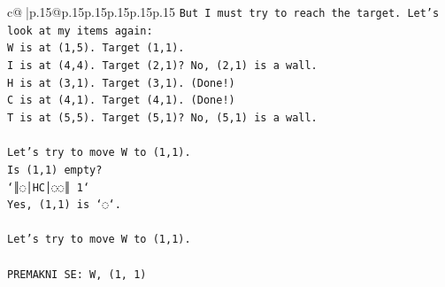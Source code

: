 \documentclass{article}
\begin{document}
{\begin{supertabular}{c@{$\;$}|p{.15\linewidth}@{}p{.15\linewidth}p{.15\linewidth}p{.15\linewidth}p{.15\linewidth}p{.15\linewidth}}
{{{\texttt{But I must try to reach the target. Let's look at my items again:} \\
\texttt{W is at (1,5). Target (1,1).} \\
\texttt{I is at (4,4). Target (2,1)? No, (2,1) is a wall.} \\
\texttt{H is at (3,1). Target (3,1). (Done!)} \\
\texttt{C is at (4,1). Target (4,1). (Done!)} \\
\texttt{T is at (5,5). Target (5,1)? No, (5,1) is a wall.} \\
\\ 
\texttt{Let's try to move W to (1,1).} \\
\texttt{Is (1,1) empty?} \\
\texttt{`║◌│HC│◌◌║ 1`} \\
\texttt{Yes, (1,1) is `◌`.} \\
\\ 
\texttt{Let's try to move W to (1,1).} \\
\\ 
\texttt{PREMAKNI SE: W, (1, 1)} \\
            }
        }
    }
     \\ \\


\end{supertabular}}
\end{document}
